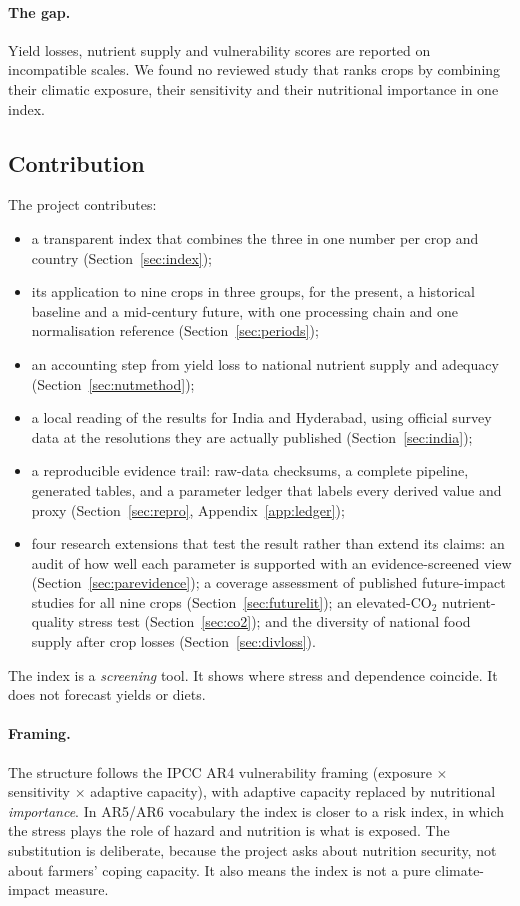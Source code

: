 \paragraph{The gap.} Yield losses, nutrient supply and vulnerability scores are reported on incompatible scales.
We found no reviewed study that ranks crops by combining their climatic exposure, their sensitivity and their
nutritional importance in one index.

\subsection{Contribution}
The project contributes:
\begin{itemize}
\item a transparent index that combines the three in one number per crop and country (Section~\ref{sec:index});
\item its application to nine crops in three groups, for the present, a historical baseline and a mid-century
future, with one processing chain and one normalisation reference (Section~\ref{sec:periods});
\item an accounting step from yield loss to national nutrient supply and adequacy (Section~\ref{sec:nutmethod});
\item a local reading of the results for India and Hyderabad, using official survey data at the resolutions
they are actually published (Section~\ref{sec:india});
\item a reproducible evidence trail: raw-data checksums, a complete pipeline, generated tables, and a parameter
ledger that labels every derived value and proxy (Section~\ref{sec:repro}, Appendix~\ref{app:ledger});
\item four research extensions that test the result rather than extend its claims: an audit of how well each
parameter is supported with an evidence-screened view (Section~\ref{sec:parevidence}); a coverage assessment of
published future-impact studies for all nine crops (Section~\ref{sec:futurelit}); an elevated-CO$_2$ nutrient-quality
stress test (Section~\ref{sec:co2}); and the diversity of national food supply after crop losses
(Section~\ref{sec:divloss}).
\end{itemize}
The index is a \emph{screening} tool. It shows where stress and dependence coincide. It does not forecast yields
or diets.

\paragraph{Framing.} The structure follows the IPCC AR4 vulnerability framing (exposure $\times$ sensitivity
$\times$ adaptive capacity), with adaptive capacity replaced by nutritional \emph{importance}. In AR5/AR6
vocabulary the index is closer to a risk index, in which the stress plays the role of hazard and nutrition is
what is exposed. The substitution is deliberate, because the project asks about nutrition security, not about
farmers' coping capacity. It also means the index is not a pure climate-impact measure.

